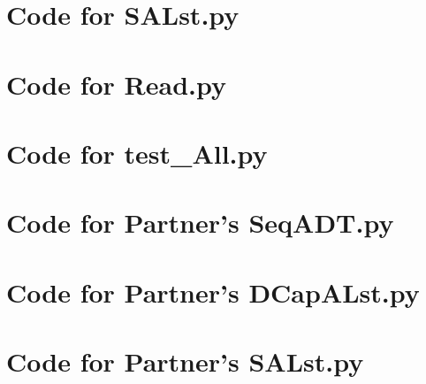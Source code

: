 \documentclass[12pt]{article}
\begin{document}
\noindent 

\newpage

\section{Code for SALst.py}

\noindent 

\newpage

\section{Code for Read.py}

\noindent 

\newpage

\section{Code for test\_All.py}

\noindent 

\newpage

\section{Code for Partner's SeqADT.py}

\noindent 

\newpage

\section{Code for Partner's DCapALst.py}

\noindent 

\newpage

\section{Code for Partner's SALst.py}

\noindent 
\end{document}
